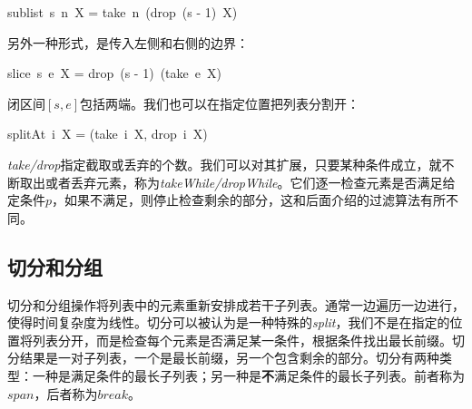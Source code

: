 \documentclass[b5paper]{ctexart}
\begin{document}
\be
sublist\ s\ n\ X = take\ n\ (drop\ (s - 1)\ X)
\ee

另外一种形式，是传入左侧和右侧的边界：

\be
slice\ s\ e\ X = drop\ (s - 1)\ (take\ e\ X)
\ee

闭区间$[s, e]$包括两端。我们也可以在指定位置把列表分割开：

\be
splitAt\ i\ X = (take\ i\ X, drop\ i\ X)
\label{eq:split-at}
\ee

 
\textit{take/drop}指定截取或丢弃的个数。我们可以对其扩展，只要某种条件成立，就不断取出或者丢弃元素，称为\textit{takeWhile/dropWhile}。它们逐一检查元素是否满足给定条件$p$，如果不满足，则停止检查剩余的部分，这和后面介绍的过滤算法有所不同。

\be
{}
\ee

\subsection{切分和分组}
  

切分和分组操作将列表中的元素重新安排成若干子列表。通常一边遍历一边进行，使得时间复杂度为线性。切分可以被认为是一种特殊的\textit{split}，我们不是在指定的位置将列表分开，而是检查每个元素是否满足某一条件，根据条件找出最长前缀。切分结果是一对子列表，一个是最长前缀，另一个包含剩余的部分。切分有两种类型：一种是满足条件的最长子列表；另一种是\textbf{不}满足条件的最长子列表。前者称为$span$，后者称为$break$。
\end{document}
